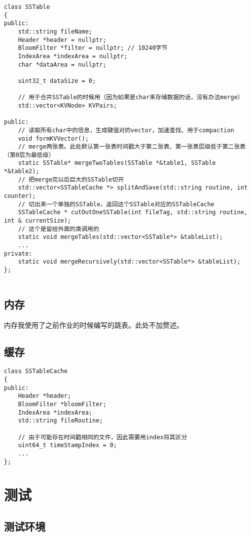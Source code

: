 \documentclass[fontset=windows]{article}
\begin{document}
\begin{lstlisting}
class SSTable
{
public:
    std::string fileName;
    Header *header = nullptr;
    BloomFilter *filter = nullptr; // 10240字节
    IndexArea *indexArea = nullptr;
    char *dataArea = nullptr;

    uint32_t dataSize = 0;

    // 用于合并SSTable的时候用（因为如果是char来存储数据的话，没有办法merge）
    std::vector<KVNode> KVPairs;

public:
    // 读取所有char中的信息，生成键值对的vector，加速查找、用于compaction
    void formKVVector();
    // merge两张表。此处默认第一张表时间戳大于第二张表、第一张表层级低于第二张表（第0层为最低级）
    static SSTable* mergeTwoTables(SSTable *&table1, SSTable *&table2);
    // 把merge完以后巨大的SSTable切开
    std::vector<SSTableCache *> splitAndSave(std::string routine, int counter);
    // 切出来一个单独的SSTable，返回这个SSTable对应的SSTableCache
    SSTableCache * cutOutOneSSTable(int fileTag, std::string routine, int & currentSize);
    // 这个是留给外面的类调用的
    static void mergeTables(std::vector<SSTable*> &tableList);
    ...
private:
    static void mergeRecursively(std::vector<SSTable*> &tableList);
};


\end{lstlisting}

\subsection{内存}

内存我使用了之前作业的时候编写的跳表。此处不加赘述。


\subsection{缓存}

\begin{lstlisting}
class SSTableCache
{
public:
    Header *header;
    BloomFilter *bloomFilter;
    IndexArea *indexArea;
    std::string fileRoutine;

    // 由于可能存在时间戳相同的文件，因此需要用index将其区分
    uint64_t timeStampIndex = 0; 
    ...
};
\end{lstlisting}

\section{测试}

\subsection{测试环境}
\end{document}
